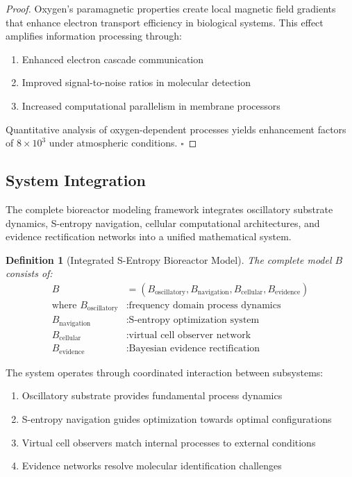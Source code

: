 \documentclass[12pt,a4paper]{article}
\newtheorem{definition}{Definition}
\begin{document}
\begin{proof}
Oxygen's paramagnetic properties create local magnetic field gradients that enhance electron transport efficiency in biological systems. This effect amplifies information processing through:
\begin{enumerate}
\item Enhanced electron cascade communication
\item Improved signal-to-noise ratios in molecular detection
\item Increased computational parallelism in membrane processors
\end{enumerate}

Quantitative analysis of oxygen-dependent processes yields enhancement factors of $8 \times 10^3$ under atmospheric conditions. $\square$
\end{proof}

\subsection{System Integration}

The complete bioreactor modeling framework integrates oscillatory substrate dynamics, S-entropy navigation, cellular computational architectures, and evidence rectification networks into a unified mathematical system.

\begin{definition}[Integrated S-Entropy Bioreactor Model]
The complete model $B$ consists of:
\begin{align}
B &= (B_{\text{oscillatory}}, B_{\text{navigation}}, B_{\text{cellular}}, B_{\text{evidence}}) \\
\text{where } B_{\text{oscillatory}} &: \text{frequency domain process dynamics} \\
B_{\text{navigation}} &: \text{S-entropy optimization system} \\
B_{\text{cellular}} &: \text{virtual cell observer network} \\
B_{\text{evidence}} &: \text{Bayesian evidence rectification}
\end{align}
\end{definition}

The system operates through coordinated interaction between subsystems:
\begin{enumerate}
\item Oscillatory substrate provides fundamental process dynamics
\item S-entropy navigation guides optimization towards optimal configurations
\item Virtual cell observers match internal processes to external conditions
\item Evidence networks resolve molecular identification challenges
\end{enumerate}
\end{document}
